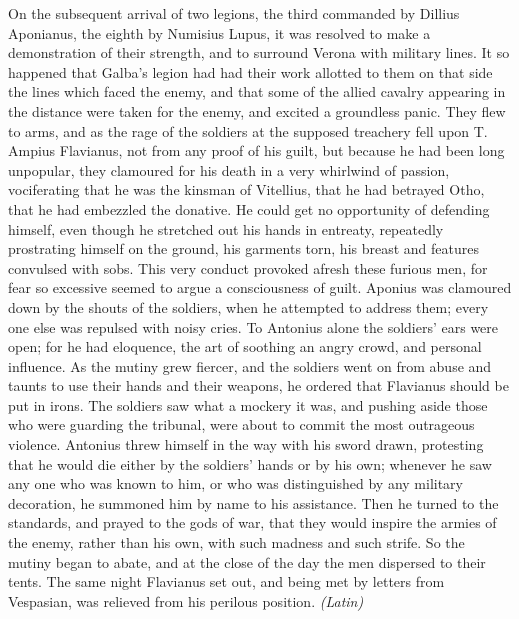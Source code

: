 On the subsequent arrival of two legions, the third commanded by Dillius Aponianus, the eighth by Numisius Lupus, it was resolved to make a demonstration of their strength, and to surround Verona with military lines. It so happened that Galba's legion had had their work allotted to them on that side the lines which faced the enemy, and that some of the allied cavalry appearing in the distance were taken for the enemy, and excited a groundless panic. They flew to arms, and as the rage of the soldiers at the supposed treachery fell upon T. Ampius Flavianus, not from any proof of his guilt, but because he had been long unpopular, they clamoured for his death in a very whirlwind of passion, vociferating that he was the kinsman of Vitellius, that he had betrayed Otho, that he had embezzled the donative. He could get no opportunity of defending himself, even though he stretched out his hands in entreaty, repeatedly prostrating himself on the ground, his garments torn, his breast and features convulsed with sobs. This very conduct provoked afresh these furious men, for fear so excessive seemed to argue a consciousness of guilt. Aponius was clamoured down by the shouts of the soldiers, when he attempted to address them; every one else was repulsed with noisy cries. To Antonius alone the soldiers' ears were open; for he had eloquence, the art of soothing an angry crowd, and personal influence. As the mutiny grew fiercer, and the soldiers went on from abuse and taunts to use their hands and their weapons, he ordered that Flavianus should be put in irons. The soldiers saw what a mockery it was, and pushing aside those who were guarding the tribunal, were about to commit the most outrageous violence. Antonius threw himself in the way with his sword drawn, protesting that he would die either by the soldiers' hands or by his own; whenever he saw any one who was known to him, or who was distinguished by any military decoration, he summoned him by name to his assistance. Then he turned to the standards, and prayed to the gods of war, that they would inspire the armies of the enemy, rather than his own, with such madness and such strife. So the mutiny began to abate, and at the close of the day the men dispersed to their tents. The same night Flavianus set out, and being met by letters from Vespasian, was relieved from his perilous position. \emph{(Latin)}


